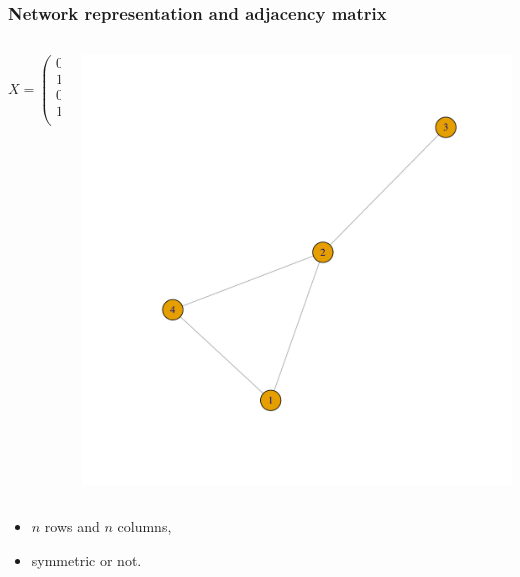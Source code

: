 \documentclass[nopagenumber,9pt]{beamer}
\begin{document}
\begin{frame}
\frametitle{Network representation and adjacency matrix}

 \begin{columns}
 \begin{column}{.45\paperwidth}
$$X=\left(
\begin{array}{rrrrr}
0 & 1 & 0 & 0 \\ 
1 & 0 & 1 & 1 \\ 
0 & 0 & 0 & 0 \\ 
1 & 1 & 0 & 0 \\ 
\end{array}\right)
$$
\end{column}

\begin{column}{.5\paperwidth}

\includegraphics[scale=.3]{plots/graphe_adj.pdf}

\end{column}

\end{columns}

\begin{itemize}
\item $n$ rows and $n$ columns,
\item symmetric or not.
\end{itemize}

\end{frame}
\end{document}
